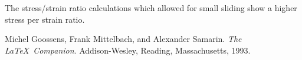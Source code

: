 \documentclass[12pt]{article}
\begin{document}
The stress/strain ratio calculations which allowed for small sliding show a higher stress per strain ratio.


\pagebreak
\begin{thebibliography}{9}
  Michel Goossens, Frank Mittelbach, and Alexander Samarin. 
  \textit{The \LaTeX\ Companion}. 
  Addison-Wesley, Reading, Massachusetts, 1993.
\end{thebibliography}
\end{document}
